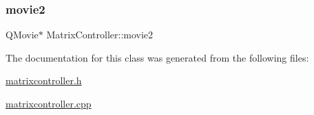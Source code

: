 \mbox{\label{class_matrix_controller_a61c645ae410eb248913174b116d4f6dd}} 
\subsubsection{\texorpdfstring{movie2}{movie2}}
{\footnotesize\ttfamily Q\+Movie$\ast$ Matrix\+Controller\+::movie2\hspace{0.3cm}{\ttfamily [private]}}



The documentation for this class was generated from the following files\+:\begin{DoxyCompactItemize}
\item 
\mbox{\hyperlink{matrixcontroller_8h}{matrixcontroller.\+h}}\item 
\mbox{\hyperlink{matrixcontroller_8cpp}{matrixcontroller.\+cpp}}\end{DoxyCompactItemize}

